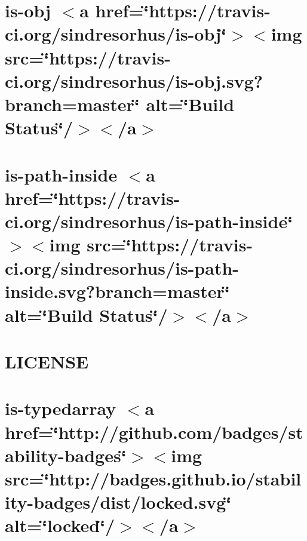 \let\mypdfximage\pdfximage\def\pdfximage{\immediate\mypdfximage}\documentclass[twoside]{book}
\newcommand{\+}{\discretionary{\mbox{\scriptsize$\hookleftarrow$}}{}{}}
\begin{document}
\chapter{is-\/obj $<$a href=\char`\"{}https\+://travis-\/ci.\+org/sindresorhus/is-\/obj\char`\"{}$>$$<$img src=\char`\"{}https\+://travis-\/ci.\+org/sindresorhus/is-\/obj.\+svg?branch=master\char`\"{} alt=\char`\"{}\+Build Status\char`\"{}/$>$$<$/a$>$}
\label{md__c_1__git_hub__p_r_o_y_e_c_t_o-_i_i_i-_g_o_t_rest-api-node-mysql_node_modules_is-obj_readme}

\chapter{is-\/path-\/inside $<$a href=\char`\"{}https\+://travis-\/ci.\+org/sindresorhus/is-\/path-\/inside\char`\"{}$>$$<$img src=\char`\"{}https\+://travis-\/ci.\+org/sindresorhus/is-\/path-\/inside.\+svg?branch=master\char`\"{} alt=\char`\"{}\+Build Status\char`\"{}/$>$$<$/a$>$}
\label{md__c_1__git_hub__p_r_o_y_e_c_t_o-_i_i_i-_g_o_t_rest-api-node-mysql_node_modules_is-path-inside_readme}

\chapter{L\+I\+C\+E\+N\+SE}
\label{md__c_1__git_hub__p_r_o_y_e_c_t_o-_i_i_i-_g_o_t_rest-api-node-mysql_node_modules_is-typedarray__l_i_c_e_n_s_e}

\chapter{is-\/typedarray $<$a href=\char`\"{}http\+://github.\+com/badges/stability-\/badges\char`\"{}$>$$<$img src=\char`\"{}http\+://badges.\+github.\+io/stability-\/badges/dist/locked.\+svg\char`\"{} alt=\char`\"{}locked\char`\"{}/$>$$<$/a$>$}
\label{md__c_1__git_hub__p_r_o_y_e_c_t_o-_i_i_i-_g_o_t_rest-api-node-mysql_node_modules_is-typedarray__r_e_a_d_m_e}

\end{document}
